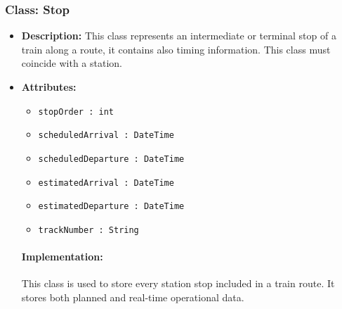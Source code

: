 \documentclass{article}
\begin{document}
\subsubsection*{Class: Stop}
\begin{itemize}
    \item \textbf{Description:} This class represents an intermediate or terminal stop of a train along a route, it contains also timing information. This class must coincide with a station.
    \item \textbf{Attributes:}
    \begin{itemize}

    \item \texttt{stopOrder : int}
    \item \texttt{scheduledArrival : DateTime}
    \item \texttt{scheduledDeparture : DateTime}
    \item \texttt{estimatedArrival : DateTime}
    \item \texttt{estimatedDeparture : DateTime}
    \item \texttt{trackNumber : String}

    \end{itemize}
    \paragraph{Implementation:} This class is used to store every station stop included in a train route. It stores both planned and real-time operational data.
\end{itemize}
\newpage
\end{document}
